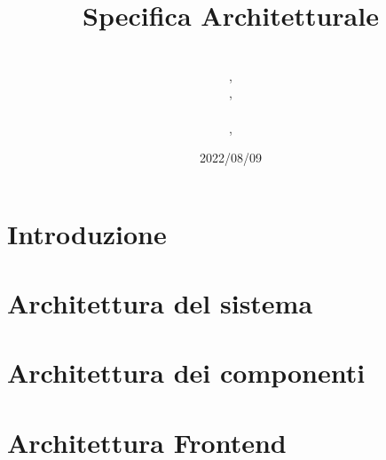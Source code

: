 \documentclass{classes/base}
\title{Specifica Architetturale}
\date{2022/08/09}
\author{\\ \marcov, \\ \marcob, \\ \matteo \\, \giulio}
\begin{document}
	\maketitle
	\newpage
	
	\newpage
	\tableofcontents
	\newpage
	\listoffigures
  
	\newpage
	\section{Introduzione}
	

	\newpage
	\section{Architettura del sistema}
	

	\newpage
	\section{Architettura dei componenti}
	

	\newpage
	\section{Architettura Frontend}
	
\end{document}

